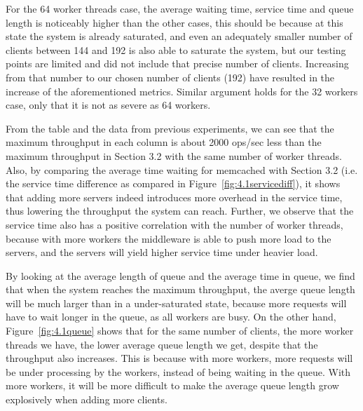 For the 64 worker threads case, the average waiting time, service time and queue length is noticeably higher than the other cases, this should be because at this state the system is already saturated, and even an adequately smaller number of clients between 144 and 192 is also able to saturate the system, but our testing points are limited and did not include that precise number of clients. Increasing from that number to our chosen number of clients (192) have resulted in the increase of the aforementioned metrics. Similar argument holds for the 32 workers case, only that it is not as severe as 64 workers.

From the table and the data from previous experiments, we can see that the maximum throughput in each column is about 2000 ops/sec less than the maximum throughput in Section 3.2 with the same number of worker threads. Also, by comparing the average time waiting for memcached with Section 3.2 (i.e. the service time difference as compared in Figure~\ref{fig:4.1servicediff}), it shows that adding more servers indeed introduces more overhead in the service time, thus lowering the throughput the system can reach. Further, we observe that the service time also has a positive correlation with the number of worker threads, because with more workers the middleware is able to push more load to the servers, and the servers will yield higher service time under heavier load.

By looking at the average length of queue and the average time in queue, we find that when the system reaches the maximum throughput, the averge queue length will be much larger than in a under-saturated state, because more requests will have to wait longer in the queue, as all workers are busy. On the other hand, Figure~\ref{fig:4.1queue} shows that for the same number of clients, the more worker threads we have, the lower average queue length we get, despite that the throughput also increases. This is because with more workers, more requests will be under processing by the workers, instead of being waiting in the queue. With more workers, it will be more difficult to make the average queue length grow explosively when adding more clients.
